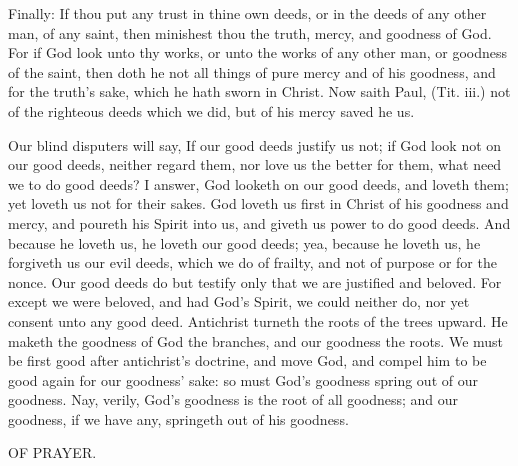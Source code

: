 Finally: If thou put any trust in thine own deeds, or 
in the deeds of any other man, of any saint, then minishest 
thou the truth, mercy, and goodness of God. For if God 
look unto thy works, or unto the works of any other man, 
or goodness of the saint, then doth he not all things of 
pure mercy and of his goodness, and for the truth's sake, 
which he hath sworn in Christ. Now saith Paul, (Tit. iii.) 
not of the righteous deeds which we did, but of his 
mercy saved he us. 

Our blind disputers will say, If our good deeds justify 
us not; if God look not on our good deeds, neither regard 
them, nor love us the better for them, what need we to do 
good deeds? I answer, God looketh on our good deeds, 
and loveth them; yet loveth us not for their sakes. God 
loveth us first in Christ of his goodness and mercy, and 
poureth his Spirit into us, and giveth us power to do good 
deeds. And because he loveth us, he loveth our good 
deeds; yea, because he loveth us, he forgiveth us our evil 
deeds, which we do of frailty, and not of purpose or for 
the nonce. Our good deeds do but testify only that we 
are justified and beloved. For except we were beloved, 
and had God's Spirit, we could neither do, nor yet consent
unto any good deed. Antichrist turneth the roots of 
the trees upward. He maketh the goodness of God the 
branches, and our goodness the roots. We must be first 
good after antichrist's doctrine, and move God, and compel
him to be good again for our goodness' sake: so must 
God's goodness spring out of our goodness. Nay, verily, 
God's goodness is the root of all goodness; and our goodness,
if we have any, springeth out of his goodness. 


OF PRAYER. 

